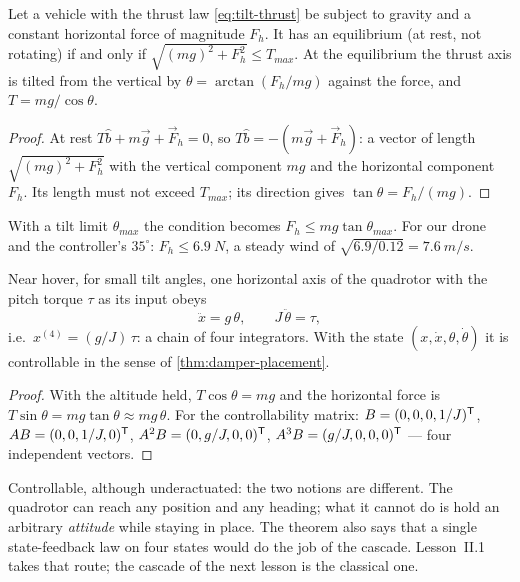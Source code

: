 \begin{theorem}
\label{thm:tilt-hover}
Let a vehicle with the thrust law \eqref{eq:tilt-thrust} be subject to gravity and a constant horizontal force of magnitude $F_h$. It has an equilibrium (at rest, not rotating) if and only if $\sqrt{(mg)^2 + F_h^2} \le T_{max}$. At the equilibrium the thrust axis is tilted from the vertical by $\theta = \arctan(F_h/mg)$ against the force, and $T = mg/\cos\theta$.
\end{theorem}
\begin{proof}
At rest $T\hat b + m\vec g + \vec F_h = 0$, so $T\hat b = -(m\vec g + \vec F_h)$: a vector of length $\sqrt{(mg)^2 + F_h^2}$ with the vertical component $mg$ and the horizontal component $F_h$. Its length must not exceed $T_{max}$; its direction gives $\tan\theta = F_h/(mg)$.
\end{proof}

With a tilt limit $\theta_{max}$ the condition becomes $F_h \le mg\tan\theta_{max}$. For our drone and the controller's $35^\circ$: $F_h \le \SI{6.9}{N}$, a steady wind of $\sqrt{6.9/0.12} = \SI{7.6}{m/s}$.

\begin{theorem}
\label{thm:tilt-chain}
Near hover, for small tilt angles, one horizontal axis of the quadrotor with the pitch torque $\tau$ as its input obeys
\begin{equation*}
  \ddot x = g\,\theta, \qquad J\,\ddot\theta = \tau ,
\end{equation*}
i.e.\ $x^{(4)} = (g/J)\,\tau$: a chain of four integrators. With the state $(x, \dot x, \theta, \dot\theta)$ it is controllable in the sense of \cref{thm:damper-placement}.
\end{theorem}
\begin{proof}
With the altitude held, $T\cos\theta = mg$ and the horizontal force is $T\sin\theta = mg\tan\theta \approx mg\,\theta$. For the controllability matrix: $B = (0, 0, 0, 1/J)^{\mathsf{T}}$, $AB = (0, 0, 1/J, 0)^{\mathsf{T}}$, $A^2B = (0, g/J, 0, 0)^{\mathsf{T}}$, $A^3B = (g/J, 0, 0, 0)^{\mathsf{T}}$ — four independent vectors.
\end{proof}

Controllable, although underactuated: the two notions are different. The quadrotor can reach any position and any heading; what it cannot do is hold an arbitrary \emph{attitude} while staying in place. The theorem also says that a single state-feedback law on four states would do the job of the cascade. Lesson~II.1 takes that route; the cascade of the next lesson is the classical one.

